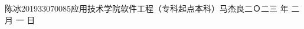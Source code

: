 \documentclass[a4paper]{nuist}
\begin{document}
{陈冰}{201933070085}{应用技术学院}{软件工程（专科起点本科）}{马杰良}{二Ｏ二三\hspace{0.4em} 年\hspace{0.4em} 二\hspace{0.4em} 月\hspace{0.4em} 一\hspace{0.4em} 日}





% 
% 
% 
% 
% 






% 
% 
% 
% 





\end{document}
